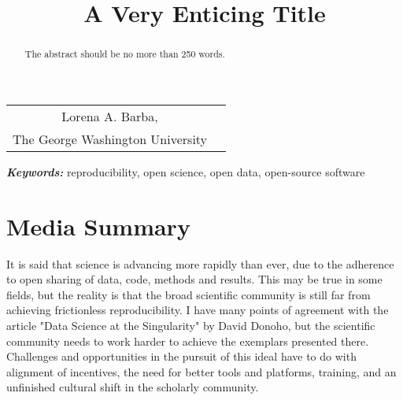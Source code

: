 \documentclass[]{hdsr}
\begin{document}




\begin{center}

  \title{A Very Enticing Title}
  \maketitle

  \thispagestyle{empty}
  
  \vspace*{.2in}

  \begin{tabular}{cc}
    Lorena A. Barba\upstairs{\affilone,*},
   \\[0.25ex]
   {\small \upstairs{\affilone} The George Washington University} \\
  \end{tabular}
  
  \vspace*{0.4in}

\begin{abstract}
The abstract should be no more than 250 words.
\end{abstract}
\end{center}

\vspace*{0.15in}
\hspace{10pt}
  \small	
  \textbf{\textit{Keywords: }} {reproducibility, open science, open data, open-source software}
  
\copyrightnotice

\section*{Media Summary}

It is said that science is advancing more rapidly than ever, due to the adherence to open sharing of data, code, methods and results. This may be true in some fields, but the reality is that the broad scientific community is still far from achieving frictionless reproducibility. I have many points of agreement with the article "Data Science at the Singularity" by David Donoho, but the scientific community needs to work harder to achieve the exemplars presented there. Challenges and opportunities in the pursuit of this ideal have to do with alignment of incentives, the need for better tools and platforms, training, and an unfinished cultural shift in the scholarly community.
\end{document}

